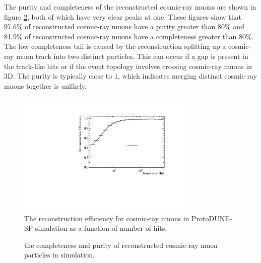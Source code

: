 The purity and completeness of the reconstructed cosmic-ray muons are shown in figure \ref{fig:crrecopurcom}, both of which have very clear peaks at one.  These figures show that 97.6\% of reconstructed cosmic-ray muons have a purity greater than 80\% and 81.9\% of reconstructed cosmic-ray muons have a completeness greater than 80\%.  The low completeness tail is caused by the reconstruction splitting up a cosmic-ray muon track into two distinct particles.  This can occur if a gap is present in the track-like hits or if the event topology involves crossing cosmic-ray muons in 3D.  The purity is typically close to 1, which indicates merging distinct cosmic-ray muons together is unlikely. 

\begin{figure}
\centering
\includegraphics[width=0.75\textwidth]{Figures/Metrics/MC/Cosmics/CosmicRayEfficiencyVsNHits.pdf}
\caption{The reconstruction efficiency for cosmic-ray muons in ProtoDUNE-SP simulation as a function of number of hits.}
\label{fig:crrecoeff}
\end{figure}

\begin{figure}
\caption{\protect{} the completeness and \protect{} purity of reconstructed cosmic-ray muon particles in simulation.}
\label{fig:crrecopurcom}
\end{figure}

